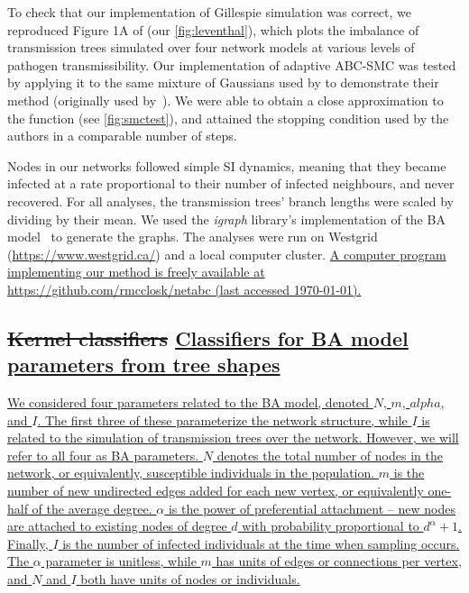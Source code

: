 \documentclass[12pt]{article}\usepackage[]{graphicx}\usepackage[]{color}
\let\mref\cref
\let\mciteauthor\citeauthor
\renewcommand{\cref}[1]{\mbox{\mref{#1}}}
\renewcommand{\citeauthor}[1]{\mbox{\mciteauthor{#1}}}
\newcommand{\add}[1]{\color{blue} \uline{#1} \color{black}}
\newcommand{\del}[1]{\color{red} \sout{#1} \color{black}}
\begin{document}
To check that our implementation of Gillespie simulation was correct, we
reproduced Figure 1A of \textcite{leventhal2012inferring} (our
\cref{fig:leventhal}), which plots the imbalance of transmission trees
simulated over four network models at various levels of pathogen
transmissibility. Our implementation of adaptive ABC-SMC was tested by applying
it to the same mixture of Gaussians used by \citeauthor{del2012adaptive} to
demonstrate their method (originally used by~\textcite{sisson2007sequential}).
We were able to obtain a close approximation to the function (see
\cref{fig:smctest}), and attained the stopping condition used by the authors in
a comparable number of steps. 

Nodes in our networks followed simple SI dynamics, meaning that they became
infected at a rate proportional to their number of infected neighbours, and
never recovered. For all analyses, the transmission trees' branch lengths were
scaled by dividing by their mean. We used the \textit{igraph} library's
implementation of the BA model~\autocite{csardi2006igraph} to generate the
graphs. The analyses were run on Westgrid (\url{https://www.westgrid.ca/}) and
a local computer cluster. \add{A computer program implementing our method is
freely available at \url{https://github.com/rmcclosk/netabc} (last accessed
\today).}

\subsection*{\del{Kernel classifiers}\add{Classifiers for BA model parameters from tree shapes}}

\add{We considered four parameters related to the BA model, denoted $N$, $m$,
$alpha$, and $I$. The first three of these parameterize the network structure,
while $I$ is related to the simulation of transmission trees over the network.
However, we will refer to all four as BA parameters. $N$ denotes the total
number of nodes in the network, or equivalently, susceptible individuals in the
population. $m$ is the number of new undirected edges added for each new
vertex, or equivalently one-half of the average degree. $\alpha$ is the power
of preferential attachment -- new nodes are attached to existing nodes of
degree $d$ with probability proportional to $d^{\alpha} + 1$. Finally, $I$ is
the number of infected individuals at the time when sampling occurs. The
$\alpha$ parameter is unitless, while $m$ has units of edges or connections per
vertex, and $N$ and $I$ both have units of nodes or individuals.}
\end{document}
